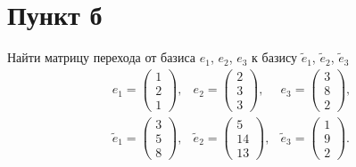 \documentclass[12pt]{article}
\begin{document}
    \section*{Пункт б}
    Найти матрицу перехода от базиса $e_1$, $e_2$, $e_3$ к базису $\widetilde{e}_1$, $\widetilde{e}_2$, $\widetilde{e}_3$
    \[
        \begin{array}{l}
            e_1 =
            \begin{pmatrix}
                1 \\ 2 \\ 1
            \end{pmatrix},              \\
            \widetilde{e}_1
            =
            \begin{pmatrix}
                3 \\ 5 \\ 8
            \end{pmatrix},
        \end{array}
        \begin{array}{l}
            e_2 =
            \begin{pmatrix}
                2 \\ 3 \\ 3
            \end{pmatrix},              \\
            \widetilde{e}_2
            =
            \begin{pmatrix}
                5 \\ 14 \\ 13
            \end{pmatrix},
        \end{array}
        \begin{array}{l}
            e_3 =
            \begin{pmatrix}
                3 \\ 8 \\ 2
            \end{pmatrix},              \\
            \widetilde{e}_3
            =
            \begin{pmatrix}
                1 \\ 9 \\ 2
            \end{pmatrix}.
        \end{array}
    \]
\end{document}
